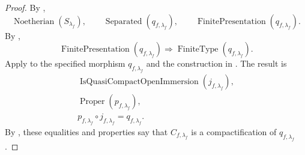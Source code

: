 \begin{proof}
\checked
  By ,
  \[
    \operatorname{Noetherian}(S_{\lambda_f}),
    \qquad
    \operatorname{Separated}(q_{f,\lambda_f}),
    \qquad
    \operatorname{FinitePresentation}(q_{f,\lambda_f}).
  \]
  By
  \cite[\href{https://stacks.math.columbia.edu/tag/01TW}{Tag 01TW}]
  {stacks-project},
  \[
    \operatorname{FinitePresentation}(q_{f,\lambda_f})
      \Longrightarrow
    \operatorname{FiniteType}(q_{f,\lambda_f}).
  \]
  Apply
   to the specified morphism
  $q_{f,\lambda_f}$ and the construction in
  .  The result is
  \[
  \begin{gathered}
    \operatorname{IsQuasiCompactOpenImmersion}(j_{f,\lambda_f}),\\
    \operatorname{Proper}(p_{f,\lambda_f}),\\
    p_{f,\lambda_f}\circ j_{f,\lambda_f}=q_{f,\lambda_f}.
  \end{gathered}
  \]
  By , these equalities and properties say
  that $C_{f,\lambda_f}$ is a compactification of $q_{f,\lambda_f}$.
\end{proof}

